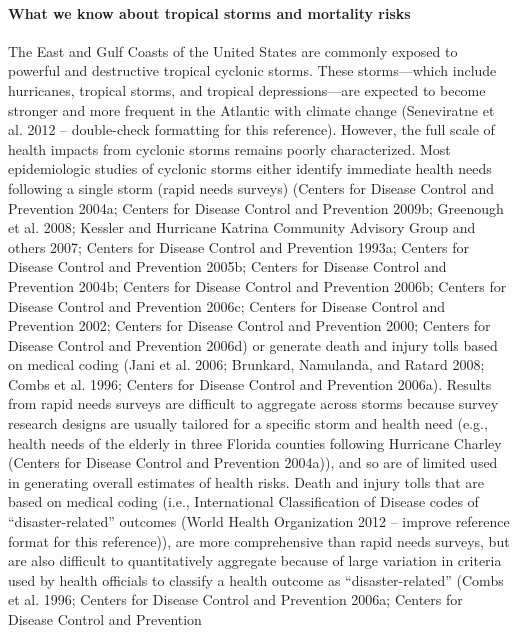 \documentclass[]{elsarticle} %
\begin{document}
\paragraph{What we know about tropical storms and mortality
risks}\label{what-we-know-about-tropical-storms-and-mortality-risks}

The East and Gulf Coasts of the United States are commonly exposed to
powerful and destructive tropical cyclonic storms. These storms---which
include hurricanes, tropical storms, and tropical depressions---are
expected to become stronger and more frequent in the Atlantic with
climate change (Seneviratne et al. 2012 -- double-check formatting for
this reference). However, the full scale of health impacts from cyclonic
storms remains poorly characterized. Most epidemiologic studies of
cyclonic storms either identify immediate health needs following a
single storm (rapid needs surveys) (Centers for Disease Control and
Prevention 2004a; Centers for Disease Control and Prevention 2009b;
Greenough et al. 2008; Kessler and Hurricane Katrina Community Advisory
Group and others 2007; Centers for Disease Control and Prevention 1993a;
Centers for Disease Control and Prevention 2005b; Centers for Disease
Control and Prevention 2004b; Centers for Disease Control and Prevention
2006b; Centers for Disease Control and Prevention 2006c; Centers for
Disease Control and Prevention 2002; Centers for Disease Control and
Prevention 2000; Centers for Disease Control and Prevention 2006d) or
generate death and injury tolls based on medical coding (Jani et al.
2006; Brunkard, Namulanda, and Ratard 2008; Combs et al. 1996; Centers
for Disease Control and Prevention 2006a). Results from rapid needs
surveys are difficult to aggregate across storms because survey research
designs are usually tailored for a specific storm and health need (e.g.,
health needs of the elderly in three Florida counties following
Hurricane Charley (Centers for Disease Control and Prevention 2004a)),
and so are of limited used in generating overall estimates of health
risks. Death and injury tolls that are based on medical coding (i.e.,
International Classification of Disease codes of ``disaster-related''
outcomes (World Health Organization 2012 -- improve reference format for
this reference)), are more comprehensive than rapid needs surveys, but
are also difficult to quantitatively aggregate because of large
variation in criteria used by health officials to classify a health
outcome as ``disaster-related'' (Combs et al. 1996; Centers for Disease
Control and Prevention 2006a; Centers for Disease Control and Prevention
\end{document}
